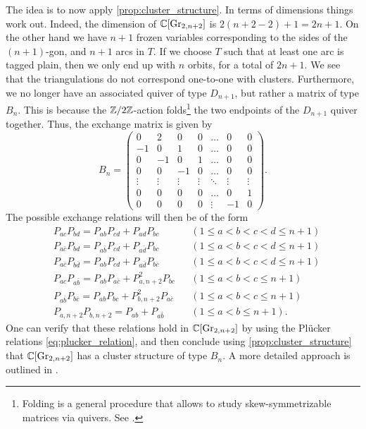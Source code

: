 The idea is to now apply \cref{prop:cluster_structure}. In terms of dimensions
things work out. Indeed, the dimension of $\mathbb{C}[\operatorname{Gr}_{2,n+2}]$ is $2(n+2-2) + 1 = 2n +
	1$. On the other hand we have $n+1$ frozen variables corresponding to the sides of the
$(n+1)$-gon, and $n+1$ arcs in $T$. If we choose $T$ such that at least one arc is
tagged plain, then we only end up with $n$ orbits, for a total of $2n + 1$. We see that
the triangulations do not correspond one-to-one with clusters. Furthermore, we no
longer have an associated quiver of type $D_{n+1}$, but rather a matrix of type $B_n$.
This is because the $\mathbb{Z}/2\mathbb{Z}$-action folds\footnote{Folding is a general procedure
	that allows to study skew-symmetrizable matrices via quivers. See \cite[Chapter
		4]{FominWilliams2021IntroductionCA_4-5}.} the two endpoints of the $D_{n+1}$ quiver
together. Thus, the exchange matrix is given by
\begin{equation*}
	B_n = \begin{pmatrix}
		0      & 2      & 0      & 0      & \dots  & 0      & 0      \\
		-1     & 0      & 1      & 0      & \dots  & 0      & 0      \\
		0      & -1     & 0      & 1      & \dots  & 0      & 0      \\
		0      & 0      & -1     & 0      & \dots  & 0      & 0      \\
		\vdots & \vdots & \vdots & \vdots & \ddots & \vdots & \vdots \\
		0      & 0      & 0      & 0      & \dots  & 0      & 1      \\
		0      & 0      & 0      & 0      & \vdots & -1     & 0
	\end{pmatrix}.
\end{equation*}
%
The possible exchange relations will then be of the form
\begin{align*}
	 & P_{ac} P_{bd} = P_{ab}P_{cd} + P_{ad}P_{bc}                        &  & (1\leq a < b < c < d \leq n+1)  \\
	 & P_{a \bar{c}}P_{bd} = P_{a\bar{b}}P_{cd} + P_{a\bar{d}}P_{bc}      &  & (1 \leq a < b < c < d \leq n+1) \\
	 & P_{a\bar{c}}P_{b\bar{d}} = P_{ab}P_{cd} + P_{a\bar{d}}P_{b\bar{c}} &  & (1\leq a < b < c < d \leq n+1)  \\
	 & P_{ac}P_{a\bar{b}} = P_{ab}P_{a\bar{c}} + P^2_{a,n+2}P_{bc}        &  & (1 \leq a < b < c \leq n+1)     \\
	 & P_{a\bar{b}}P_{b\bar{c}} = P_{ab}P_{bc} + P_{b,n+2}^2 P_{a\bar{c}} &  & (1 \leq a < b < c \leq n+1)     \\
	 & P_{a,n+2}P_{b,n+2} = P_{ab} + P_{a\bar{b}}                         &  & (1 \leq a < b \leq n+1).
\end{align*}
%
One can verify that these relations hold in $\mathbb{C}[\operatorname{Gr}_{2, n+2}]$ by using the Plücker
relations \cref{eq:plucker_relation}, and then conclude using
\cref{prop:cluster_structure} that $\mathbb{C}[\operatorname{Gr}_{2, n+2}]$ has a cluster structure of type
$B_n$. A more detailed approach is outlined in \cite[Example
	6.3.2]{FominWilliams2021IntroductionCA_6}.

